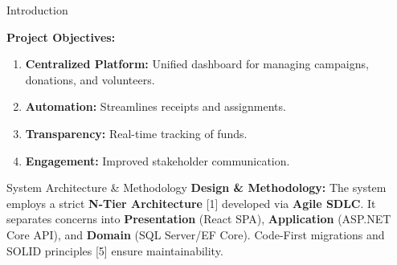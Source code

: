 \documentclass[final,hyperref={pdfpagelabels=false}]{beamer}
\newlength{\onecolwid}
\begin{document}
\begin{frame}[t]
\begin{columns}[t]
\begin{column}{\onecolwid}
\begin{block}{\Large Introduction}
\begin{center}
\end{center}

\textbf{Project Objectives:}
\begin{enumerate}
    \item \textbf{Centralized Platform:} Unified dashboard for managing campaigns, donations, and volunteers.
    \item \textbf{Automation:} Streamlines receipts and assignments.
    \item \textbf{Transparency:} Real-time tracking of funds.
    \item \textbf{Engagement:} Improved stakeholder communication.
\end{enumerate}
\end{block}

\vskip0.2cm

\begin{block}{\Large System Architecture \& Methodology}
\justify
\large
\textbf{Design \& Methodology:}
The system employs a strict \textbf{N-Tier Architecture} [1] developed via \textbf{Agile SDLC}. It separates concerns into \textbf{Presentation} (React SPA), \textbf{Application} (ASP.NET Core API), and \textbf{Domain} (SQL Server/EF Core). Code-First migrations and SOLID principles [5] ensure maintainability.

\vskip0.1cm

\begin{center}
\begin{tikzpicture}[auto,
    block/.style={rectangle, draw, fill=secondarycolor!20, 
        text width=10cm, text centered, rounded corners, minimum height=1.2cm},
    arrow/.style={thick,->,>=stealth}]
    

\end{tikzpicture}
\end{center}
\end{block}
\end{column}
\end{columns}
\end{frame}
\end{document}
